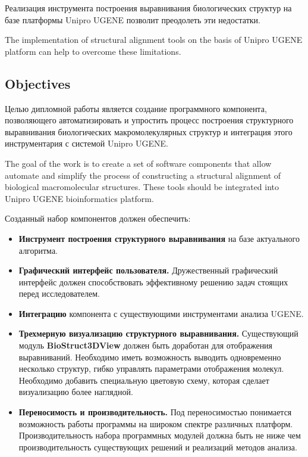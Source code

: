 \documentclass[a4paper, 12pt, titlepage, utf8]{extarticle}
\newcommand{\class}{\textbf}
\newcommand{\module}{\class}
\begin{document}
\begin{original}
\begin{original}
\begin{original}
Реализация инструмента построения выравнивания биологических структур на базе
платформы Unipro UGENE позволит преодолеть эти недостатки.
\end{original}

The implementation of structural alignment tools on the basis of Unipro UGENE
platform can help to overcome these limitations.

\newpage
\subsection{Objectives}
\begin{original}
Целью дипломной работы является создание программного компонента, позволяющего
автоматизировать и упростить процесс построения структурного выравнивания
биологических макромолекулярных структур и интеграция этого инструментария с
системой Unipro UGENE.
\end{original}

The goal of the work is to create a set of software components that allow
automate and simplify the process of constructing a structural alignment of
biological macromolecular structures. These tools should be integrated into
Unipro UGENE bioinformatics platform.

\begin{original}
Созданный набор компонентов должен обеспечить:
\begin{itemize}
    \item \textbf{Инструмент построения структурного выравнивания} на базе
актуального алгоритма.

    \item \textbf{Графический интерфейс пользователя.} Дружественный графический
интерфейс должен способствовать эффективному решению задач стоящих перед
исследователем.

    \item \textbf{Интеграцию} компонента с существующими инструментами анализа
UGENE.

    \item \textbf{Трехмерную визуализацию структурного выравнивания.}
Существующий модуль \module{BioStruct3DView} должен быть доработан для
отображения выравниваний. Необходимо иметь возможность выводить одновременно
несколько структур, гибко управлять параметрами отображения молекул. Необходимо
добавить специальную цветовую схему, которая сделает визуализацию более
наглядной.

    \item \textbf{Переносимость и производительность.} Под переносимостью
понимается возможность работы программы на широком спектре различных платформ.
Производительность набора программных модулей должна быть не ниже чем
производительность существующих решений и реализаций методов анализа.


\end{itemize}
\end{original}
\end{original}
\end{original}
\end{document}
